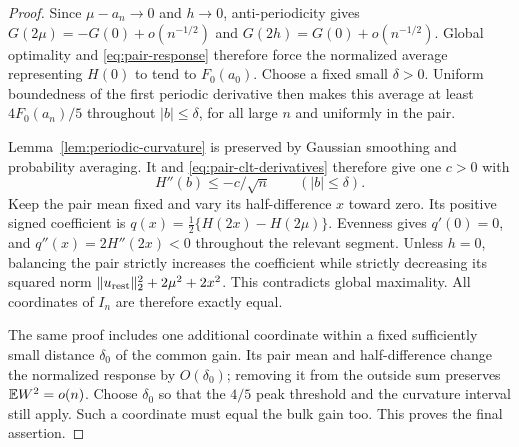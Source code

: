 \begin{proof}
Since $\mu-a_n\to0$ and $h\to0$,
anti-periodicity gives $G(2\mu)=-G(0)+o(n^{-1/2})$ and
$G(2h)=G(0)+o(n^{-1/2})$. Global optimality and
\eqref{eq:pair-response} therefore force the normalized average
representing $H(0)$ to tend to $F_0(a_0)$. Choose a fixed small
$\delta>0$. Uniform boundedness of the first periodic derivative
then makes this average at least $4F_0(a_n)/5$ throughout
$|b|\le\delta$, for all large $n$ and uniformly in the pair.

Lemma~\ref{lem:periodic-curvature} is preserved by Gaussian smoothing
and probability averaging. It and \eqref{eq:pair-clt-derivatives}
therefore give one $c>0$ with
\[
 H''(b)\le-c/\sqrt n\qquad(|b|\le\delta).
\]
Keep the pair mean fixed and vary its half-difference $x$ toward
zero. Its positive signed coefficient is
$q(x)=\tfrac12\{H(2x)-H(2\mu)\}$. Evenness gives $q'(0)=0$,
and $q''(x)=2H''(2x)<0$ throughout the relevant segment. Unless
$h=0$, balancing the pair strictly increases the coefficient while
strictly decreasing its squared norm
$\|u_{\rm rest}\|_2^2+2\mu^2+2x^2$. This contradicts global
maximality. All coordinates of $I_n$ are therefore exactly equal.

The same proof includes one additional coordinate within a fixed
sufficiently small distance $\delta_0$ of the common gain. Its
pair mean and half-difference change the normalized response by
$O(\delta_0)$; removing it from the outside sum preserves
$\mathbb E W^2=o(n)$. Choose $\delta_0$ so that the $4/5$ peak threshold
and the curvature interval still apply. Such a coordinate must
equal the bulk gain too. This proves the final assertion.
\end{proof}

